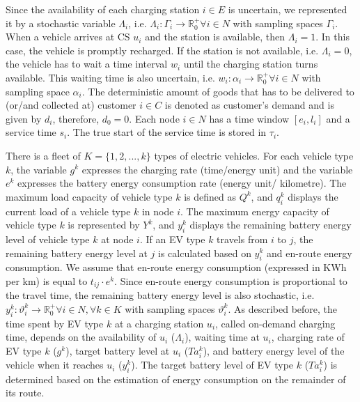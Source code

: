 \documentclass[11pt]{article}
\begin{document}
Since the availability of each charging station $i \in E$ is uncertain, we represented it by a stochastic variable $\Lambda_i$, i.e. $\Lambda_i:\Gamma_{i} \to \mathbb{R}_0^+ \forall i \in N$ with sampling spaces $\Gamma_{i}$. When a vehicle arrives at CS $u_i$ and the station is available, then $\Lambda_i = 1$. In this case, the vehicle is promptly recharged. If the station is not available, i.e. $\Lambda_i = 0$, the vehicle has to wait a time interval $w_i$ until the charging station turns available. This waiting time is also uncertain, i.e. $w_i:\alpha_{i} \to \mathbb{R}_0^+ \forall i \in N$ with sampling space $\alpha_{i}$. The deterministic amount of goods that has to be delivered to (or/and collected at) customer $i \in C$ is denoted as customer's demand and is given by $d_i$, therefore, $d_0 = 0$. Each node $i \in N$ has a time window $[e_i, l_i]$ and a service time $s_i$. The true start of the service time is stored in $\tau_i$.

There is a fleet of $K = \{1,2,...,k\}$ types of electric vehicles. For each vehicle type $k$, the variable $g^k$ expresses the charging rate (time/energy unit) and the variable $e^k$ expresses the battery energy consumption rate (energy unit/ kilometre). The maximum load capacity of vehicle type $k$ is defined as $Q^k$, and $q^k_i$ displays the current load of a vehicle type $k$ in node $i$. The maximum energy capacity of vehicle type $k$ is represented by $Y^k$, and $y^k_i$ displays the remaining battery energy level of vehicle type $k$ at node $i$. If an EV type $k$ travels from $i$ to $j$, the remaining battery energy level at $j$ is calculated based on $y^k_i$ and en-route energy consumption. We assume that en-route energy consumption (expressed in KWh per km) is equal to $t_{ij} \cdot e^k$. Since en-route energy consumption is proportional to the travel time, the remaining battery energy level is also stochastic, i.e. $y^k_i:\vartheta^k_{i} \to \mathbb{R}_0^+ \forall i \in N, \forall k \in K$ with sampling spaces $\vartheta^k_{i}$. As described before, the time spent by EV type $k$ at a charging station $u_i$, called on-demand charging time, depends on the availability of $u_i$ ($\Lambda_i$), waiting time at $u_i$, charging rate of EV type $k$ ($g^k$), target battery level at $u_i$ ($Ta_i^k$), and battery energy level of the vehicle when it reaches $u_i$ ($y^k_i$). The target battery level of EV type $k$ ($Ta_i^k$) is determined based on the estimation of energy consumption on the remainder of its route.
\end{document}
